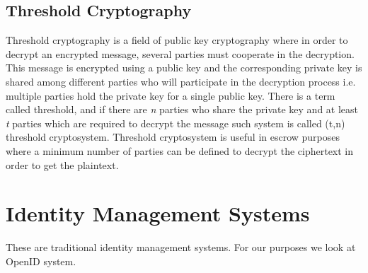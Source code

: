 \subsection{Threshold Cryptography}
Threshold cryptography is a field of public key cryptography where in order to decrypt an encrypted message, several parties must cooperate in the decryption. This message is encrypted using a public key and the corresponding private key is shared among different parties who will participate in the decryption process i.e. multiple parties hold the private key for a single public key. There is a term called threshold, and if there are \textit{n} parties who share the private key and at least \textit{t} parties which are required to decrypt the message such system is called (t,n) threshold cryptosystem. Threshold cryptosystem is useful in escrow purposes where a minimum number of parties can be defined to decrypt the ciphertext in order to get the plaintext.

\section{Identity Management Systems}
These are traditional identity management systems. For our purposes we look at OpenID system.
